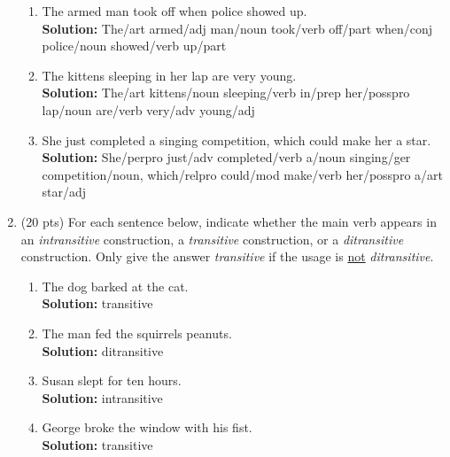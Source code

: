 \documentclass[11pt]{article}
\begin{document}
\begin{enumerate}
\begin{enumerate}
\item The armed man took off when police showed up.  \\
\textbf{Solution:} The/{\sc art} armed/{\sc adj} man/{\sc noun} took/{\sc verb} off/{\sc part} when/{\sc conj} police/{\sc noun} showed/{\sc verb} up/{\sc part}  \\


\item The kittens sleeping in her lap are very young.   \\
\textbf{Solution:} The/{\sc art} kittens/{\sc noun} sleeping/{\sc verb} in/{\sc prep} her/{\sc posspro} lap/{\sc noun} are/{\sc verb} very/{\sc adv} young/{\sc adj}  \\

\item She just completed a singing competition, which could make her a star.  \\
\textbf{Solution:} She/{\sc perpro} just/{\sc adv} completed/{\sc verb} a/{\sc noun} singing/{\sc ger} competition/{\sc noun}, which/{\sc relpro} could/{\sc mod} make/{\sc verb} her/{\sc posspro} a/{\sc art} star/{\sc adj} \\


\end{enumerate}



\newpage
\item (20 pts) For each sentence below, indicate whether the main verb
  appears in an {\it intransitive} construction, a {\it transitive}
  construction, or a {\it ditransitive} construction. Only give the
  answer {\it transitive} if the   usage is \underline{not} {\it ditransitive}.

\begin{enumerate}

\item The dog barked at the cat. \\
\textbf{Solution:} transitive\\

\item The man fed the squirrels peanuts.  \\
\textbf{Solution:} ditransitive\\

\item Susan slept for ten hours. \\
\textbf{Solution:} intransitive\\

\item George broke the window with his fist. \\
\textbf{Solution:} transitive\\


\end{enumerate}
\end{enumerate}
\end{document}
